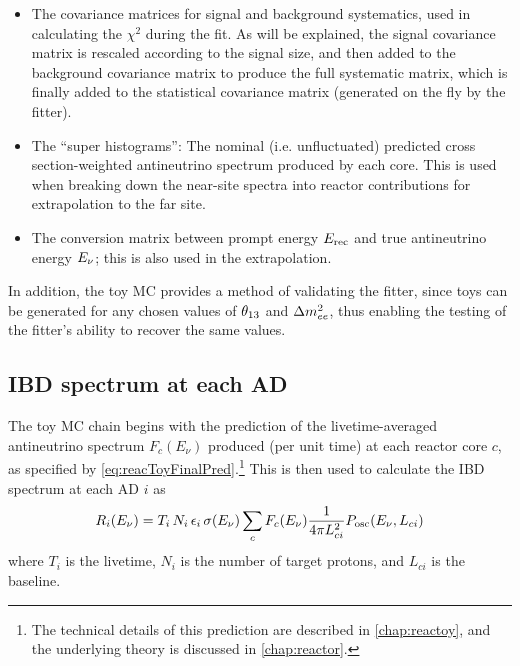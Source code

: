 \documentclass[../thesis.tex]{subfiles}
\begin{document}
\begin{itemize}
\item The covariance matrices for signal and background systematics, used in calculating the $\chi^2$ during the fit. As will be explained, the signal covariance matrix is rescaled according to the signal size, and then added to the background covariance matrix to produce the full systematic matrix, which is finally added to the statistical covariance matrix (generated on the fly by the fitter).
\item The ``super histograms'': The nominal (i.e. unfluctuated) predicted cross section-weighted antineutrino spectrum produced by each core. This is used when breaking down the near-site spectra into reactor contributions for extrapolation to the far site.
\item The conversion matrix between prompt energy $E_\mathrm{rec}$ and true antineutrino energy $E_\mathrm{\nu}$; this is also used in the extrapolation.
\end{itemize}

In addition, the toy MC provides a method of validating the fitter, since toys can be generated for any chosen values of $\theta_{13}$ and $\Delta m^2_{ee}$, thus enabling the testing of the fitter's ability to recover the same values.

\begin{comment}
  The toy MC also generates a ``PredictedIBD'' file which contains the background-free no-oscillation IBD spectra of each detector. As far as I can tell, this is only used in order to calculate a `summed' covariance matrix in which the matrices of the three stages (6, 8, 7AD) are combined, with the weighting determined by the PredictedIBD counts. (Oscillations shouldn't affect this weighting between ADs in the same hall, or the weighting between different stages.) In turn, the summed matrix is not used during the fit, but is only produced as a diagnostic. 
\end{comment}

\subsection{IBD spectrum at each AD}
\label{sec:fitToyFluxPred}

The toy MC chain begins with the prediction of the livetime-averaged antineutrino spectrum $F_c(E_\nu)$ produced (per unit time) at each reactor core $c$, as specified by \autoref{eq:reacToyFinalPred}.\footnote{The technical details of this prediction are described in \autoref{chap:reactoy}, and the underlying theory is discussed in \autoref{chap:reactor}.} This is then used to calculate the IBD spectrum at each AD $i$ as
\begin{equation}
  \label{eq:fitTrueIbdSpec}
  R_i(E_\nu) = T_i\,N_i\,\epsilon_i\,\sigma(E_\nu) \sum_c F_c(E_\nu) \frac{1}{4\pi L_{ci}^2}
  P_\mathrm{osc}(E_\nu, L_{ci})
\end{equation}
where $T_i$ is the livetime, $N_i$ is the number of target protons, and $L_{ci}$ is the baseline.
\end{document}
